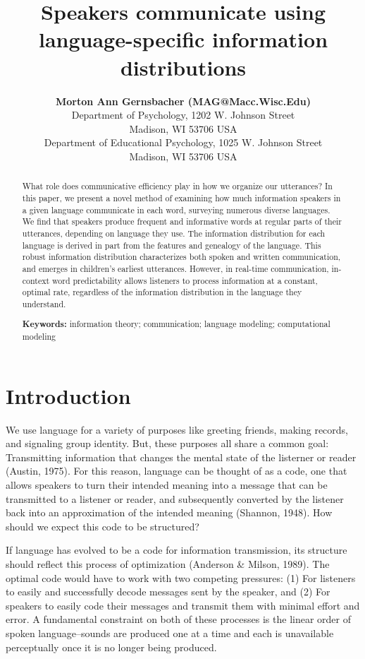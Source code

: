 \documentclass[10pt, letterpaper]{article}
\title{Speakers communicate using language-specific information distributions}
\author{{\large \bf Morton Ann Gernsbacher (MAG@Macc.Wisc.Edu)} \\ Department of Psychology, 1202 W. Johnson Street \\ Madison, WI 53706 USA \AND {\large \bf Sharon J.~Derry (SDJ@Macc.Wisc.Edu)} \\ Department of Educational Psychology, 1025 W. Johnson Street \\ Madison, WI 53706 USA}
\begin{document}
\maketitle

\begin{abstract}
What role does communicative efficiency play in how we organize our
utterances? In this paper, we present a novel method of examining how
much information speakers in a given language communicate in each word,
surveying numerous diverse languages. We find that speakers produce
frequent and informative words at regular parts of their utterances,
depending on language they use. The information distribution for each
language is derived in part from the features and genealogy of the
language. This robust information distribution characterizes both spoken
and written communication, and emerges in children's earliest
utterances. However, in real-time communication, in-context word
predictability allows listeners to process information at a constant,
optimal rate, regardless of the information distribution in the language
they understand.

\textbf{Keywords:}
information theory; communication; language modeling; computational
modeling
\end{abstract}

\hypertarget{introduction}{%
\section{Introduction}\label{introduction}}

We use language for a variety of purposes like greeting friends, making
records, and signaling group identity. But, these purposes all share a
common goal: Transmitting information that changes the mental state of
the listerner or reader (Austin, 1975). For this reason, language can be
thought of as a code, one that allows speakers to turn their intended
meaning into a message that can be transmitted to a listener or reader,
and subsequently converted by the listener back into an approximation of
the intended meaning (Shannon, 1948). How should we expect this code to
be structured?

If language has evolved to be a code for information transmission, its
structure should reflect this process of optimization (Anderson \&
Milson, 1989). The optimal code would have to work with two competing
pressures: (1) For listeners to easily and successfully decode messages
sent by the speaker, and (2) For speakers to easily code their messages
and transmit them with minimal effort and error. A fundamental
constraint on both of these processes is the linear order of spoken
language--sounds are produced one at a time and each is unavailable
perceptually once it is no longer being produced.
\end{document}
